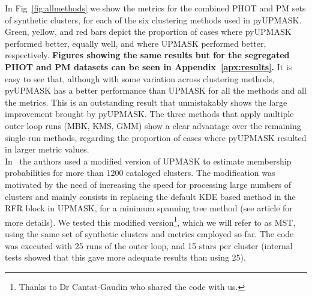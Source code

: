\documentclass{aa}
\begin{document}
 In Fig~\ref{fig:allmethods} we show the metrics for the combined PHOT and PM
 sets of synthetic clusters, for each of the six clustering methods used in
 pyUPMASK. Green, yellow, and red bars depict the proportion of cases where
 pyUPMASK performed better, equally well, and where UPMASK performed
 better, respectively. \textbf{Figures showing the same results but for the
 segregated PHOT and PM datasets can be seen in Appendix~\ref{apx:results}.}
 It is easy to see that, although with some variation across clustering methods,
 pyUPMASK has a better performance than UPMASK for all the methods and all the
 metrics.
 This is an outstanding result that unmistakably shows the large improvement
 brought by pyUPMASK.
 The three methods that apply multiple outer loop runs (MBK, KMS, GMM) show a
 clear advantage over the remaining single-run methods, regarding the
 proportion of cases where pyUPMASK resulted in larger metric values.\\

 In~\cite{Cantat_2018} the authors used a modified version of UPMASK to
 estimate membership probabilities for more than 1200 cataloged clusters. The
 modification was motivated by the need of increasing the speed for processing
 large numbers of clusters and mainly consists in replacing the default KDE
 based method in the RFR block in UPMASK, for a minimum spanning tree method 
 (see article for more details).
 We tested this modified version\footnote{Thanks to Dr Cantat-Gaudin
 who shared the code with us.}, which we will refer to as MST, using the same
 set of synthetic clusters and metrics employed so far. The code was executed
 with 25 runs of the outer loop, and 15 stars per cluster (internal tests
 showed that this gave more adequate results than using 25).\\
\end{document}
